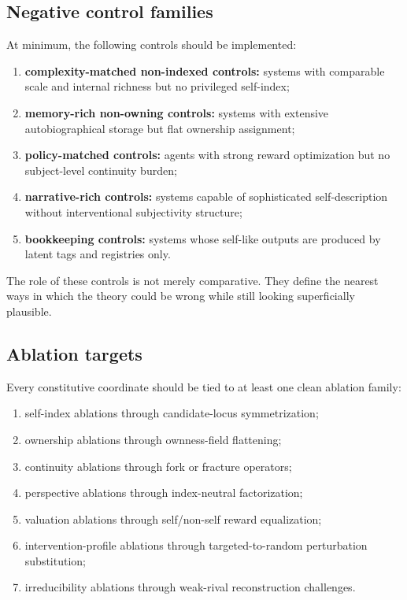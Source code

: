 \documentclass[11pt,a4paper]{article}
\theoremstyle{definition}
\begin{document}
\subsection{Negative control families}
At minimum, the following controls should be implemented:
\begin{enumerate}[leftmargin=1.5em]
\item \textbf{complexity-matched non-indexed controls:} systems with comparable scale and internal richness but no privileged self-index;
\item \textbf{memory-rich non-owning controls:} systems with extensive auto\-bio\-graphical storage but flat ownership assignment;
\item \textbf{policy-matched controls:} agents with strong reward optimization but no subject-level continuity burden;
\item \textbf{narrative-rich controls:} systems capable of sophisticated self-description without interventional subjectivity structure;
\item \textbf{bookkeeping controls:} systems whose self-like outputs are produced by latent tags and registries only.
\end{enumerate}
The role of these controls is not merely comparative. They define the nearest ways in which the theory could be wrong while still looking superficially plausible.

\subsection{Ablation targets}
Every constitutive coordinate should be tied to at least one clean ablation family:
\begin{enumerate}[leftmargin=1.5em]
\item self-index ablations through candidate-locus symmetrization;
\item ownership ablations through ownness-field flattening;
\item continuity ablations through fork or fracture operators;
\item perspective ablations through index-neutral factorization;
\item valuation ablations through self/non-self reward equalization;
\item intervention-profile ablations through targeted-to-random perturbation substitution;
\item irreducibility ablations through weak-rival reconstruction challenges.
\end{enumerate}
\end{document}
